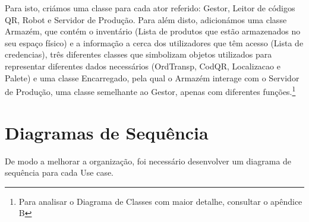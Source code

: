 \documentclass[a4paper]{report}
\begin{document}
    Para isto, criámos uma classe para cada ator referido: Gestor, Leitor de códigos QR, Robot e Servidor de Produção. Para além disto, adicionámos uma classe Armazém, que contém o inventário (Lista de produtos que estão armazenados no seu espaço físico) e a informação a cerca dos utilizadores que têm acesso (Lista de credencias), três diferentes classes que simbolizam objetos utilizados para representar diferentes dados necessários (OrdTransp, CodQR, Localizacao e Palete) e uma classe Encarregado, pela qual o Armazém interage com o Servidor de Produção, uma classe semelhante ao Gestor, apenas com diferentes funções.\footnote{Para analisar o Diagrama de Classes com maior detalhe, consultar o apêndice B}


\chapter{Diagramas de Sequência}
    De modo a melhorar a organização, foi necessário desenvolver um diagrama de sequência para cada Use case.
    
\end{document}

